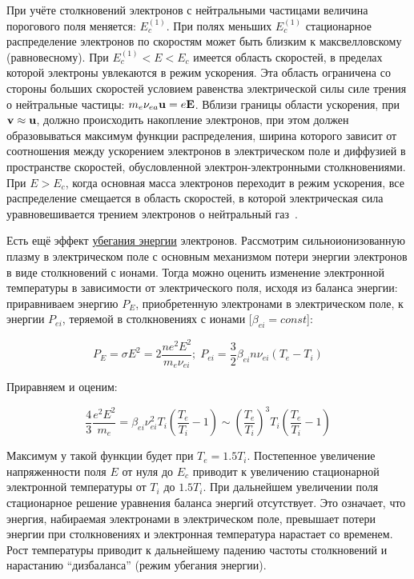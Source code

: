 \documentclass[10pt, a4paper]{article}
\begin{document}
При учёте столкновений электронов с нейтральными частицами величина порогового поля меняется: $E_c^{(1)}$. При полях меньших $E_c^{(1)}$ стационарное распределение электронов по скоростям может быть близким к максвелловскому (равновесному). При $E_c^{(1)}<E<E_c$ имеется область скоростей, в пределах которой электроны увлекаются в режим ускорения. Эта область ограничена со стороны больших скоростей условием равенства электрической силы силе трения о нейтральные частицы: $m_e\nu_{ea}\vb{u}=e\vb{E}$. Вблизи границы области ускорения, при $\vb{v}\approx\vb{u}$, должно происходить накопление электронов, при этом должен образовываться максимум функции распределения, ширина которого зависит от соотношения между ускорением электронов в электрическом поле и диффузией в пространстве скоростей, обусловленной электрон-электронными столкновениями. При $E>E_c$, когда основная масса электронов переходит в режим ускорения, все распределение смещается в область скоростей, в которой электрическая сила уравновешивается трением электронов о нейтральный газ~\cite{golant}.

Есть ещё эффект \uline{убегания энергии} электронов. Рассмотрим сильноионизованную плазму в электрическом поле с основным механизмом потери энергии электронов в виде столкновений с ионами. Тогда можно оценить изменение электронной температуры в зависимости от электрического поля, исходя из баланса энергии: приравниваем  энергию $P_E$, приобретенную электронами в электрическом поле, к энергии $P_{ei}$, теряемой в столкновениях с ионами [$\beta_{ei}=const$]:

\begin{equation} \label{eq:runaway_el_balance}
	P_E = \sigma E^2 = 2\frac{ne^2 E^2}{m_e\nu_{ei}};\;P_{ei} = \frac{3}{2}\beta_{ei}n\nu_{ei}(T_e-T_i)
\end{equation}

Приравняем и оценим:

\begin{equation*}
	\frac{4}{3}\frac{e^2E^2}{m_e}=\beta_{ei}\nu_{ei}^2T_i\left(\frac{T_e}{T_i}-1\right) \sim \left(\frac{T_e}{T_i}\right)^3T_i(\frac{T_e}{T_i}-1)
\end{equation*}

Максимум у такой функции будет при $T_e=1.5T_i$. Постепенное увеличение напряженности поля $E$ от нуля до $E_c$ приводит к увеличению стационарной электронной температуры от $T_i$ до $1.5T_i$. При дальнейшем увеличении поля стационарное решение уравнения баланса энергий отсутствует. Это означает, что энергия, набираемая электронами в электрическом поле, превышает потери энергии при столкновениях и электронная температура нарастает со временем. Рост температуры приводит к дальнейшему падению частоты столкновений и нарастанию ``дизбаланса'' (режим убегания энергии).
\end{document}
